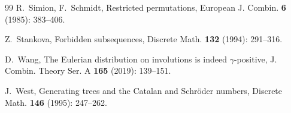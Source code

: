 \documentclass[12pt]{amsart}
\numberwithin{equation}{section}
\theoremstyle{plain}
\theoremstyle{definition}
\begin{document}
\begin{thebibliography}{99}
 R.~Simion, F.~Schmidt, Restricted permutations, European J. Combin. {\bf6} (1985): 383--406.

 Z.~Stankova, Forbidden subsequences, Discrete Math. {\bf132} (1994): 291--316.





 D.~Wang, The Eulerian distribution on involutions is indeed $\gamma$-positive, J. Combin. Theory Ser. A {\bf165} (2019): 139--151.

 J.~West, Generating trees and the Catalan and Schr\"oder numbers, Discrete Math. {\bf146} (1995): 247--262.

\end{thebibliography}
\end{document}
